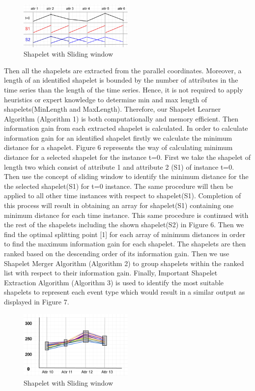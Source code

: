 \documentclass[conference]{IEEEtran}  %
\begin{document}
\begin{figure}[h!]
\includegraphics[width=0.5\textwidth]{movingWindow.png}
\caption{Shapelet with Sliding window}
\end{figure}

Then all the shapelets are extracted from the parallel coordinates. Moreover, a length of an identified shapelet is bounded by the number of attributes in the time series than the length of the time series. Hence, it is not required to apply heuristics or expert knowledge to determine min and max length of shapelets(MinLength and MaxLength). Therefore, our Shapelet Learner Algorithm (Algorithm 1) is both computationally and memory efficient. Then information gain from each extracted shapelet is calculated. In order to calculate information gain for an identified shapelet firstly we calculate the minimum distance for a shapelet. Figure 6 represents the way of calculating minimum distance for a selected shapelet for the instance t=0. First we take the shapelet of length two which consist of attribute 1 and attribute 2 (S1) of instance t=0. Then use the concept of sliding window to identify the minimum distance for the the selected shapelet(S1) for t=0 instance. The same procedure will then be applied to all other time instances with respect to shapelet(S1). Completion of this process will result in obtaining an array for shapelet(S1) containing one minimum distance for each time instance. This same procedure is continued with the rest of the shapelets including the shown shapelet(S2) in Figure 6. Then we find the optimal splitting point [1] for each array of minimum distances in order to find the maximum information gain for each shapelet. The shapelets are then ranked based on the descending order of its information gain. Then we use Shapelet Merger Algorithm (Algorithm 2) to group shapelets within the ranked list with respect to their information gain. Finally, Important Shapelet Extraction Algorithm (Algorithm 3) is used to identify the most suitable shapelets to represent each event type which would result in a similar output as displayed in Figure 7.
\begin{figure}[h!]
\includegraphics[width=0.5\textwidth]{demo.png}
\caption{Shapelet with Sliding window}
\end{figure}
\end{document}
